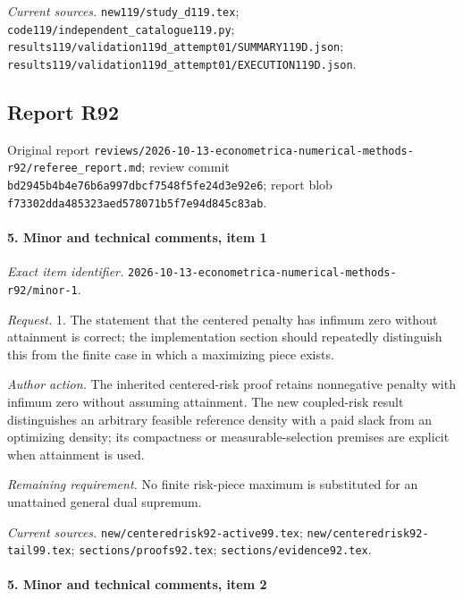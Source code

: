 \par\emph{Current sources.} \nolinkurl{new119/study_d119.tex}; \nolinkurl{code119/independent_catalogue119.py}; \nolinkurl{results119/validation119d_attempt01/SUMMARY119D.json}; \nolinkurl{results119/validation119d_attempt01/EXECUTION119D.json}.

\subsection{Report R92}

Original report \nolinkurl{reviews/2026-10-13-econometrica-numerical-methods-r92/referee_report.md}; review commit \nolinkurl{bd2945b4b4e76b6a997dbcf7548f5fe24d3e92e6}; report blob \nolinkurl{f73302dda485323aed578071b5f7e94d845c83ab}.

\paragraph{5. Minor and technical comments, item 1}

\emph{Exact item identifier.} \nolinkurl{2026-10-13-econometrica-numerical-methods-r92/minor-1}.

\par\emph{Request.} 1. The statement that the centered penalty has infimum zero without attainment is correct; the implementation section should repeatedly distinguish this from the finite case in which a maximizing piece exists.

\par\emph{Author action.} The inherited centered-risk proof retains nonnegative penalty with infimum zero without assuming attainment. The new coupled-risk result distinguishes an arbitrary feasible reference density with a paid slack from an optimizing density; its compactness or measurable-selection premises are explicit when attainment is used.

\par\emph{Remaining requirement.} No finite risk-piece maximum is substituted for an unattained general dual supremum.

\par\emph{Current sources.} \nolinkurl{new/centeredrisk92-active99.tex}; \nolinkurl{new/centeredrisk92-tail99.tex}; \nolinkurl{sections/proofs92.tex}; \nolinkurl{sections/evidence92.tex}.

\paragraph{5. Minor and technical comments, item 2}

